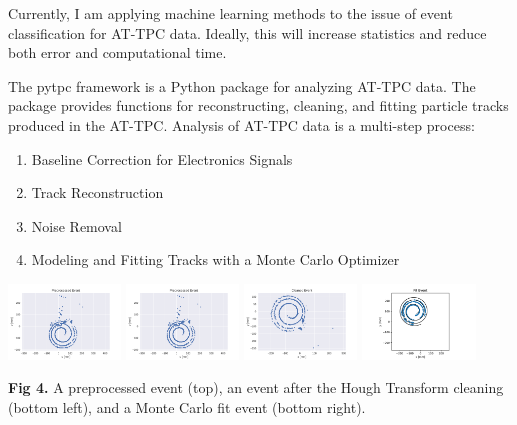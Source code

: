 \documentclass[ansiepaperDNP,portrait]{baposter}
\begin{document}
\begin{poster}
{{Currently, I am applying machine learning methods to the issue of event classification for AT-TPC data. Ideally, this will increase statistics and reduce both error and computational time.}
}

{\small{The pytpc framework is a Python package for analyzing AT-TPC data. The package provides functions for reconstructing, cleaning, and fitting particle tracks produced in the AT-TPC. Analysis of AT-TPC data is a multi-step process:

\begin{enumerate}\itemsep-0.04em
\item Baseline Correction for Electronics Signals
\item Track Reconstruction
\item Noise Removal
\item Modeling and Fitting Tracks with a Monte Carlo Optimizer
\end{enumerate}

\begin{center}
\includegraphics [width=30mm] {preprocess_evt.pdf}
\hspace{0cm}
\includegraphics [width=30mm] {preprocess_evt.pdf}
\hspace{3cm}
\includegraphics [width=30mm] {clean_evt.pdf}
\hspace{0cm}
\includegraphics [width=30mm] {fit_evt.pdf}
\end{center}
\textbf{Fig 4.} A preprocessed event (top), an event after the Hough Transform cleaning (bottom left), and a Monte Carlo fit event (bottom right).}
} 

\end{poster}
\end{document}
